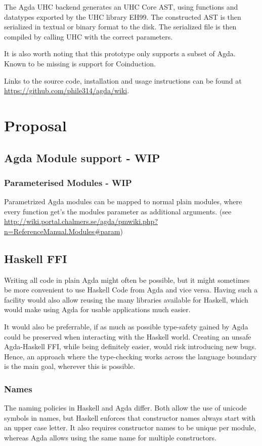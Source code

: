 \documentclass[12pt, a4paper, twoside]{report}
\begin{document}
The Agda UHC backend generates an UHC Core AST, using functions and datatypes exported
by the UHC library EH99. The constructed AST is then serialized in textual or binary format
to the disk. The serialized file is then compiled by calling UHC with the correct parameters.

It is also worth noting that this prototype only supports a subset of Agda. Known to be
missing is support for Coinduction.

Links to the source code, installation and usage instructions can be found
at \url{https://github.com/phile314/agda/wiki}.

\chapter{Proposal}
\label{chp:proposal}
\section{Agda Module support - WIP}
\subsection{Parameterised Modules - WIP}
Parametrized Agda modules can be mapped to normal plain modules, where every function get's the
modules parameter as additional arguments. (see \url{http://wiki.portal.chalmers.se/agda/pmwiki.php?n=ReferenceManual.Modules#param})

\section{Haskell FFI}
\label{sec:prop:hs-ffi}
Writing all code in plain Agda might often be possible, but it might sometimes be more
convenient to use Haskell Code from Agda and vice versa. Having such a facility would
also allow reusing the many libraries available for Haskell, which would make using Agda
for usable applications much easier.

It would also be preferrable, if as much as possible type-safety gained by Agda could be
preserved when interacting with the Haskell world. Creating an unsafe Agda-Haskell
FFI, while being definitely easier, would risk introducing new bugs. Hence, an approach
where the type-checking works across the language boundary is the main goal, wherever
this is possible.



\subsection{Names}
The naming policies in Haskell and Agda differ. Both allow the use of unicode symbols in names, but Haskell enforces
that constructor names always start with an upper case letter. It also requires constructor names to be unique
per module, whereas Agda allows using the same name for multiple constructors.
\end{document}
